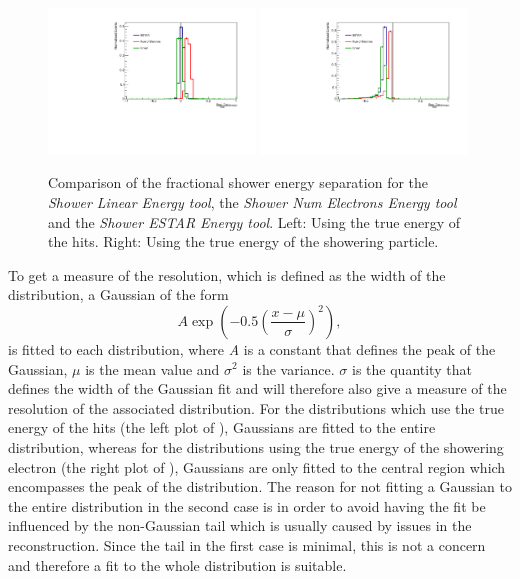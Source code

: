 \begin{figure}[h!]
    \centering
    \includegraphics[width = 0.49\textwidth]{figures-chap4/bias_cheat_plane_2_all.pdf}
    \includegraphics[width = 0.49\textwidth]{figures-chap4/bias_cheat_plane_2_all_showeringE.pdf}
    \caption[Comparison of the fractional shower energy separation.]{Comparison of the fractional shower energy separation for the \textit{Shower Linear Energy tool}, the \textit{Shower Num Electrons Energy tool} and the \textit{Shower ESTAR Energy tool}. Left: Using the true energy of the hits. Right: Using the true energy of the showering particle.}
    \label{fig:fractional_energy_resolution}
\end{figure}

\newpage
To get a measure of the resolution, which is defined as the width of the distribution, a Gaussian of the form 
\begin{equation}
    A \exp{\left(-0.5\left(\frac{x - \mu}{\sigma}\right)^2\right)},
\end{equation}
is fitted to each distribution, where \textit{A} is a constant that defines the peak of the Gaussian, $\mu$ is the mean value and $\sigma^2$ is the variance. $\sigma$ is the quantity that defines the width of the Gaussian fit and will therefore also give a measure of the resolution of the associated distribution. For the distributions which use the true energy of the hits (the left plot of ), Gaussians are fitted to the entire distribution, whereas for the distributions using the true energy of the showering electron (the right plot of ), Gaussians are only fitted to the central region which encompasses the peak of the distribution. The reason for not fitting a Gaussian to the entire distribution in the second case is in order to avoid having the fit be influenced by the non-Gaussian tail which is usually caused by issues in the reconstruction. Since the tail in the first case is minimal, this is not a concern and therefore a fit to the whole distribution is suitable. 

